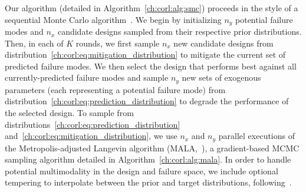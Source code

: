 {Our algorithm (detailed in Algorithm~\ref{ch:corl:alg:smc}) proceeds in the style of a sequential Monte Carlo algorithm~\cite{chopinIntroductionSequentialMonte2020}. We begin by initializing $n_y$ potential failure modes and $n_x$ candidate designs sampled from their respective prior distributions. Then, in each of $K$ rounds, we first sample $n_x$ new candidate designs from distribution~\eqref{ch:corl:eq:mitigation_distribution} to mitigate the current set of predicted failure modes. We then select the design that performs best against all currently-predicted failure modes and sample $n_y$ new sets of exogenous parameters (each representing a potential failure mode) from distribution~\eqref{ch:corl:eq:prediction_distribution} to degrade the performance of the selected design. To sample from distributions~\eqref{ch:corl:eq:prediction_distribution} and~\eqref{ch:corl:eq:mitigation_distribution}, we use $n_x$ and $n_y$ parallel executions of the Metropolis-adjusted Langevin algorithm (MALA,~\cite{robertsLangevinDiffusionsMetropolisHastings2002}), a gradient-based MCMC sampling algorithm detailed in Algorithm~\ref{ch:corl:alg:mala}. In order to handle potential multimodality in the design and failure space, we include optional tempering to interpolate between the prior and target distributions, following~\cite{chopinIntroductionSequentialMonte2020}.


}
